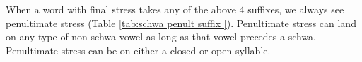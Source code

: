 When a word with final stress takes any of the above 4 suffixes, we always see penultimate stress (Table \ref{tab:schwa penult suffix }). Penultimate stress can land on any type of non-schwa vowel as long as that vowel precedes a schwa.  Penultimate stress can be on either a closed or open syllable. 


\begin{table}[H]
	\centering
	\caption{Penultimate stress   when a schwa-headed suffix is added }
	\label{tab:schwa penult suffix }
\end{table}
